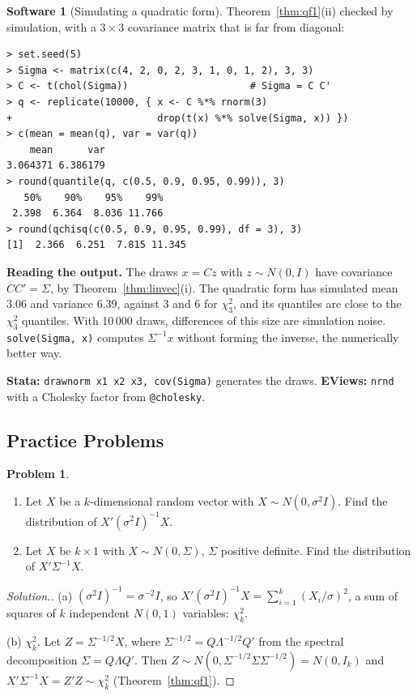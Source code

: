 \documentclass[11pt,a4paper]{article}
\numberwithin{equation}{section}
\theoremstyle{definition}
\newtheorem{software}[thm]{Software}
\newtheorem{problemx}{Problem}[subsection]
\newenvironment{problem}{\begin{problemx}}{\end{problemx}}
\newenvironment{solution}
  {\renewcommand{\qedsymbol}{}\begin{proof}[\textit{Solution}.]}
  {\end{proof}}
\begin{document}
\begin{software}[Simulating a quadratic form]
\label{sw:qfsim}
Theorem~\ref{thm:qf1}(ii) checked by simulation, with a $3 \times 3$ covariance matrix that is far from diagonal:
{\small\begin{verbatim}
> set.seed(5)
> Sigma <- matrix(c(4, 2, 0, 2, 3, 1, 0, 1, 2), 3, 3)
> C <- t(chol(Sigma))                     # Sigma = C C'
> q <- replicate(10000, { x <- C %*% rnorm(3)
+                         drop(t(x) %*% solve(Sigma, x)) })
> c(mean = mean(q), var = var(q))
    mean      var
3.064371 6.386179
> round(quantile(q, c(0.5, 0.9, 0.95, 0.99)), 3)
   50%    90%    95%    99%
 2.398  6.364  8.036 11.766
> round(qchisq(c(0.5, 0.9, 0.95, 0.99), df = 3), 3)
[1]  2.366  6.251  7.815 11.345
\end{verbatim}}
\textbf{Reading the output.} The draws $x = Cz$ with $z \sim N(0, I)$ have covariance $CC' = \Sigma$, by Theorem~\ref{thm:linvec}(i). The quadratic form has
simulated mean $3.06$ and variance $6.39$, against $3$ and $6$ for $\chi^2_3$, and its quantiles are close to the $\chi^2_3$ quantiles. With 10\,000 draws,
differences of this size are simulation noise. \texttt{solve(Sigma, x)} computes $\Sigma^{-1}x$ without forming the inverse, the numerically better way.

\textbf{Stata:} \texttt{drawnorm x1 x2 x3, cov(Sigma)} generates the draws. \textbf{EViews:} \texttt{nrnd} with a Cholesky factor from
\texttt{@cholesky}.
\end{software}

\subsection{Practice Problems}

\begin{problem}
\begin{enumerate}[label=(\alph*)]
\item Let $X$ be a $k$-dimensional random vector with $X \sim N(0, \sigma^2I)$. Find the distribution of $X'(\sigma^2I)^{-1}X$.
\item Let $X$ be $k \times 1$ with $X \sim N(0, \Sigma)$, $\Sigma$ positive definite. Find the distribution of $X'\Sigma^{-1}X$.
\end{enumerate}
\end{problem}

\begin{solution}
(a) $(\sigma^2I)^{-1} = \sigma^{-2}I$, so $X'(\sigma^2I)^{-1}X = \sum_{i=1}^k(X_i/\sigma)^2$, a sum of squares of $k$ independent $N(0, 1)$ variables: $\chi^2_k$.

(b) $\chi^2_k$. Let $Z = \Sigma^{-1/2}X$, where $\Sigma^{-1/2} = Q\Lambda^{-1/2}Q'$ from the spectral decomposition $\Sigma = Q\Lambda Q'$. Then
$Z \sim N(0, \Sigma^{-1/2}\Sigma\Sigma^{-1/2}) = N(0, I_k)$ and $X'\Sigma^{-1}X = Z'Z \sim \chi^2_k$ (Theorem~\ref{thm:qf1}).
\end{solution}
\end{document}
